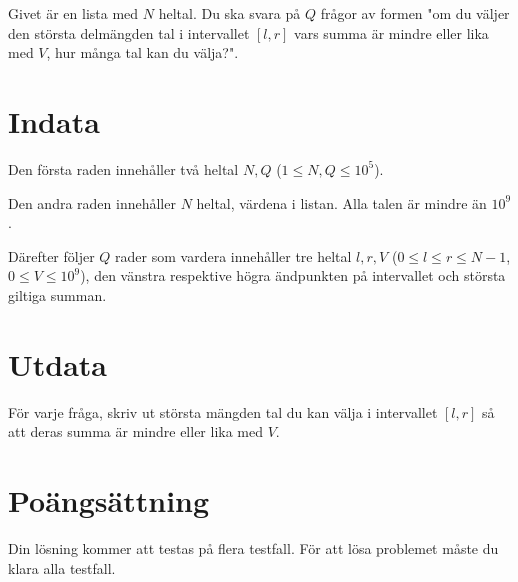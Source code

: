 Givet är en lista med $N$ heltal. Du ska svara på $Q$ frågor av formen "om du väljer den största delmängden tal i intervallet
$[l,r]$ vars summa är mindre eller lika med $V$, hur många tal kan du välja?".

\section*{Indata}
Den första raden innehåller två heltal $N,Q$ ($1 \leq N,Q \leq 10^5$).

Den andra raden innehåller $N$ heltal, värdena i listan. Alla talen är mindre än $10^9$.

Därefter följer $Q$ rader som vardera innehåller tre heltal $l, r, V$ ($0 \leq l \leq r \leq N-1$, $0 \leq V \leq 10^9$),
den vänstra respektive högra ändpunkten på intervallet och största giltiga summan.

\section*{Utdata}
För varje fråga, skriv ut största mängden tal du kan välja i intervallet $[l,r]$ så att deras summa är mindre eller lika med $V$.

\section*{Poängsättning}
Din lösning kommer att testas på flera testfall.
\noindent
För att lösa problemet måste du klara alla testfall.
